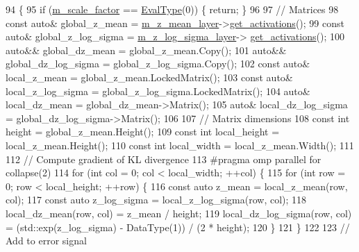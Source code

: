 \begin{DoxyCode}
94                                   \{
95   \textcolor{keywordflow}{if} (\hyperlink{classlbann_1_1objective__function__term_a59a544b8ff0455ed5091de3bf0d81c3c}{m\_scale\_factor} == \hyperlink{base_8hpp_a3266f5ac18504bbadea983c109566867}{EvalType}(0)) \{ \textcolor{keywordflow}{return}; \}
96 
97   \textcolor{comment}{// Matrices}
98   \textcolor{keyword}{const} \textcolor{keyword}{auto}& global\_z\_mean = \hyperlink{classlbann_1_1kl__divergence_a7665b4f12f4e842d1850102295c21e3e}{m\_z\_mean\_layer}->\hyperlink{classlbann_1_1Layer_a1134b1a4385af199d7272c5aa827fa99}{get\_activations}();
99   \textcolor{keyword}{const} \textcolor{keyword}{auto}& global\_z\_log\_sigma = \hyperlink{classlbann_1_1kl__divergence_aae1f6deb97728e09771840f447a571b1}{m\_z\_log\_sigma\_layer}->
      \hyperlink{classlbann_1_1Layer_a1134b1a4385af199d7272c5aa827fa99}{get\_activations}();
100   \textcolor{keyword}{auto}&& global\_dz\_mean = global\_z\_mean.Copy();
101   \textcolor{keyword}{auto}&& global\_dz\_log\_sigma = global\_z\_log\_sigma.Copy();
102   \textcolor{keyword}{const} \textcolor{keyword}{auto}& local\_z\_mean = global\_z\_mean.LockedMatrix();
103   \textcolor{keyword}{const} \textcolor{keyword}{auto}& local\_z\_log\_sigma = global\_z\_log\_sigma.LockedMatrix();
104   \textcolor{keyword}{auto}& local\_dz\_mean = global\_dz\_mean->Matrix();
105   \textcolor{keyword}{auto}& local\_dz\_log\_sigma = global\_dz\_log\_sigma->Matrix();
106 
107   \textcolor{comment}{// Matrix dimensions}
108   \textcolor{keyword}{const} \textcolor{keywordtype}{int} height = global\_z\_mean.Height();
109   \textcolor{keyword}{const} \textcolor{keywordtype}{int} local\_height = local\_z\_mean.Height();
110   \textcolor{keyword}{const} \textcolor{keywordtype}{int} local\_width = local\_z\_mean.Width();
111 
112   \textcolor{comment}{// Compute gradient of KL divergence}
113 \textcolor{preprocessor}{  #pragma omp parallel for collapse(2)}
114   \textcolor{keywordflow}{for} (\textcolor{keywordtype}{int} col = 0; col < local\_width; ++col) \{
115     \textcolor{keywordflow}{for} (\textcolor{keywordtype}{int} row = 0; row < local\_height; ++row) \{
116       \textcolor{keyword}{const} \textcolor{keyword}{auto} z\_mean = local\_z\_mean(row, col);
117       \textcolor{keyword}{const} \textcolor{keyword}{auto} z\_log\_sigma = local\_z\_log\_sigma(row, col);
118       local\_dz\_mean(row, col) = z\_mean / height;
119       local\_dz\_log\_sigma(row, col) = (std::exp(z\_log\_sigma) - DataType(1)) / (2 * height);
120     \}
121   \}
122   
123   \textcolor{comment}{// Add to error signal}

\end{DoxyCode}
